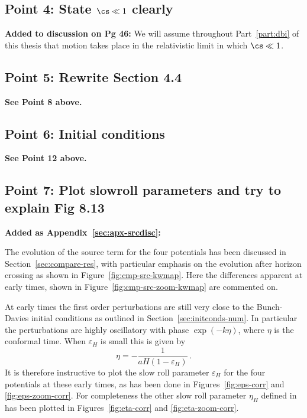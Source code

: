 \subsection{Point 4: State \texorpdfstring{$\cs\ll 1$}{cs<<1} clearly}
\textbf{Added to discussion on Pg 46:}
We will assume throughout Part~\ref{part:dbi} of this thesis that motion takes
place in the relativistic limit in which $\cs\ll1$.

\subsection{Point 5: Rewrite Section 4.4}
\textbf{See Point 8 above.}

\subsection{Point 6: Initial conditions}
\textbf{See Point 12 above.}

\subsection{Point 7: Plot slowroll parameters and try to explain Fig 8.13}

\textbf{Added as Appendix~\ref{sec:apx-srcdisc}:}

The evolution of the source term for the four potentials has been discussed in
Section~\ref{sec:compare-res}, with particular emphasis on the evolution after horizon crossing as
shown in Figure~\ref{fig:cmp-src-kwmap}. Here the differences apparent at early times, shown in
Figure~\ref{fig:cmp-src-zoom-kwmap} are commented on.

At early times the first order perturbations are still very close to the Bunch-Davies initial
conditions as outlined in Section~\ref{sec:initconds-num}. In particular the perturbations are
highly oscillatory with phase $\exp(-k\eta)$, where $\eta$ is the conformal time. When
$\varepsilon_H$ is small this is given by 
% 
\begin{equation}
 \eta = -\frac{1}{aH(1-\varepsilon_H)}\,.
\end{equation}
% 
It is therefore instructive to plot the slow roll parameter $\varepsilon_H$ for the four potentials
at these early times, as has been done in Figures~\ref{fig:eps-corr} and \ref{fig:eps-zoom-corr}.
For
completeness the other slow roll parameter $\eta_H$ defined in  has been
plotted in Figures~\ref{fig:eta-corr} and \ref{fig:eta-zoom-corr}. 

